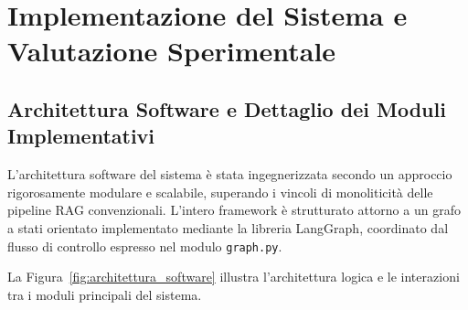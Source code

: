 \chapter{Implementazione del Sistema e Valutazione Sperimentale}
\label{chap:implementazione_valutazione}

\section{Architettura Software e Dettaglio dei Moduli Implementativi}
\label{sec:architettura_moduli}

L'architettura software del sistema è stata ingegnerizzata secondo un approccio rigorosamente modulare e scalabile, superando i vincoli di monoliticità delle pipeline RAG convenzionali. L'intero framework è strutturato attorno a un grafo a stati orientato implementato mediante la libreria LangGraph, coordinato dal flusso di controllo espresso nel modulo \texttt{graph.py}.

La Figura~\ref{fig:architettura_software} illustra l'architettura logica e le interazioni tra i moduli principali del sistema.

